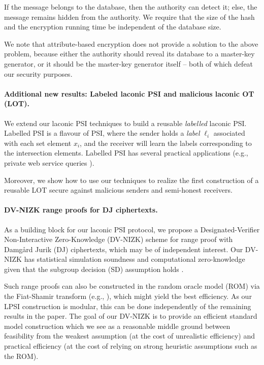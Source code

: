 If the message belongs to the database, then the authority can detect it; else, the message remains hidden from the authority. We require that the size of the hash and the encryption running time be independent of the database size.

We note that attribute-based encryption does not provide a solution to the above problem, because either the authority should reveal its database to a master-key generator, or it should be the master-key generator itself -- both of which defeat our security purposes.

 
\paragraph{Additional new results: Labeled laconic PSI and malicious laconic OT (LOT).} We extend  our laconic PSI techniques to build a reusable \emph{labelled} laconic PSI. Labelled PSI \cite{SCN:JarLiu10,CCS:CHLR18} is a flavour of  PSI, where the sender holds a \emph{label} $\ell_i$ associated with each set element $x_i$, and the receiver will learn the labels corresponding to the intersection elements.
Labelled PSI has several practical applications (e.g., private web service queries \cite{CCS:CHLR18}).
 
 Moreover,  we show how to use our techniques to realize the first construction of a reusable LOT secure against malicious senders and semi-honest receivers.

\paragraph{DV-NIZK range proofs for DJ ciphertexts.}

As a building block for our laconic PSI protocol, we propose a Designated-Verifier Non-Interactive Zero-Knowledge (DV-NIZK\footnotemark) scheme for range proof with Damg{\aa}rd Jurik (DJ) ciphertexts, which may be of independent interest. 
Our DV-NIZK has statistical simulation soundness and computational zero-knowledge given that the subgroup decision (SD) assumption holds \cite{TCC:BonGohNis05,EC:GroOstSah06}.
 

Such range proofs can also be constructed in the random oracle model (ROM) via the Fiat-Shamir transform (e.g., \cite{PKC:DamJur01,C:BBCdGL18,SP:BBBPWM18,CCS:TBMDKS20}), which might yield the best efficiency. 
 As our LPSI construction is modular, this can be done independently of the remaining results in the paper. The goal of our DV-NIZK is to provide an efficient standard model construction which we see as a reasonable middle ground between feasibility from the weakest assumption (at the cost of unrealistic efficiency) and practical efficiency (at the cost of relying on strong heuristic assumptions such as the ROM). 



